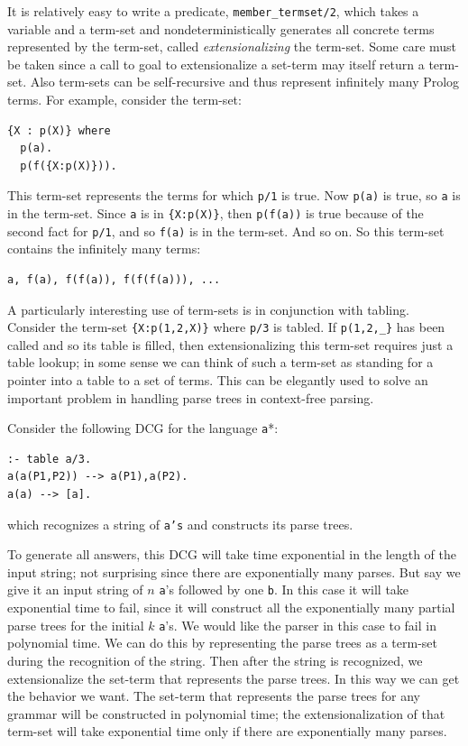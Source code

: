 It is relatively easy to write a predicate, {\tt member\_termset/2},
which takes a variable and a term-set
and non\-deterministically generates all concrete terms represented by
the term-set, called \emph{extensionalizing} the term-set.  Some care
must be taken since a call to goal to extensionalize a set-term may
itself return a term-set.  Also term-sets can be self-recursive and
thus represent infinitely many Prolog terms.  For example, consider
the term-set:
\begin{verbatim}
{X : p(X)} where
  p(a).
  p(f({X:p(X)})).
\end{verbatim}
This term-set represents the terms for which {\tt p/1} is true.  Now
{\tt p(a)} is true, so {\tt a} is in the term-set.  Since {\tt a} is
in \verb|{X:p(X)}|, then {\tt p(f(a))} is true because of the second
fact for {\tt p/1}, and so {\tt f(a)} is in the term-set.  And so on.
So this term-set contains the infinitely many terms:
\begin{verbatim}
a, f(a), f(f(a)), f(f(f(a))), ...
\end{verbatim}

A particularly interesting use of term-sets is in conjunction with
tabling.  Consider the term-set \verb|{X:p(1,2,X)}| where {\tt p/3} is
tabled.  If \verb|p(1,2,_}| has been called and so its table is
filled, then extensionalizing this term-set requires just a table
lookup; in some sense we can think of such a term-set as standing for
a pointer into a table to a set of terms.  This can be elegantly used
to solve an important problem in handling parse trees in context-free
parsing.

Consider the following DCG for the language {\tt a}*:
\begin{verbatim}
:- table a/3.
a(a(P1,P2)) --> a(P1),a(P2).
a(a) --> [a].
\end{verbatim}
which recognizes a string of {\tt a's} and constructs its parse trees.

To generate all answers, this DCG will take time exponential in the
length of the input string; not surprising since there are
exponentially many parses.  But say we give it an input string of $n$
{\tt a}'s followed by one {\tt b}.  In this case it will take
exponential time to fail, since it will construct all the
exponentially many partial parse trees for the initial $k$ {\tt a}'s.
We would like the parser in this case to fail in polynomial time.  We
can do this by representing the parse trees as a term-set during the
recognition of the string.  Then after the string is recognized, we
extensionalize the set-term that represents the parse trees.  In this
way we can get the behavior we want.  The set-term that represents the
parse trees for any grammar will be constructed in polynomial time;
the extensionalization of that term-set will take exponential time
only if there are exponentially many parses.


